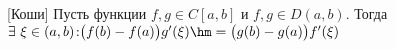 [Коши]\label{Kohi}
    Пусть функции $f,g\in C[a,b]$ и $f,g\in D(a,b)$. Тогда $\exists\ \xi\in(a,b)\colon\\ \big(f(b)-f(a)\big)g'(\xi)\hm={\big(g(b)-g(a)\big)f'(\xi)}$
